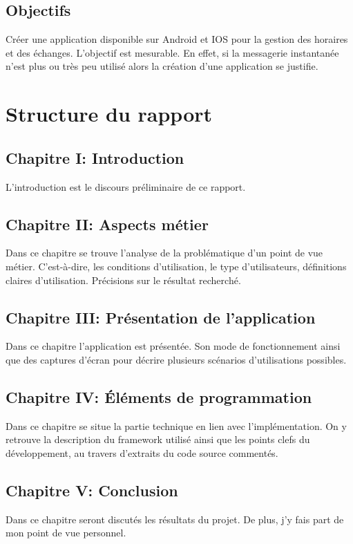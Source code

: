 \subsection*{Objectifs}

Créer une application disponible sur Android et IOS pour la gestion des horaires et des échanges. L'objectif est mesurable. En effet, si la messagerie instantanée n'est plus ou très peu utilisé alors la création d'une application se justifie.

\newpage

\section[Structure du rapport]{Structure du rapport}

\subsection*{Chapitre I: Introduction}
L'introduction est le discours préliminaire de ce rapport.

\subsection*{Chapitre II: Aspects métier}
Dans ce chapitre se trouve l'analyse de la problématique d'un point de vue métier. C'est-à-dire, les conditions d'utilisation, le type d'utilisateurs, définitions claires d'utilisation. Précisions sur le résultat recherché.

\subsection*{Chapitre III: Présentation de l'application}
Dans ce chapitre l'application est présentée. Son mode de fonctionnement ainsi que des captures d'écran pour décrire plusieurs scénarios d'utilisations possibles.

\subsection*{Chapitre IV: Éléments de programmation}
Dans ce chapitre se situe la partie technique en lien avec l'implémentation. On y retrouve la description du framework utilisé ainsi que les points clefs du développement, au travers d'extraits du code source commentés.


\subsection*{Chapitre V: Conclusion}
Dans ce chapitre seront discutés les résultats du projet. De plus, j'y fais part de mon point de vue personnel.


